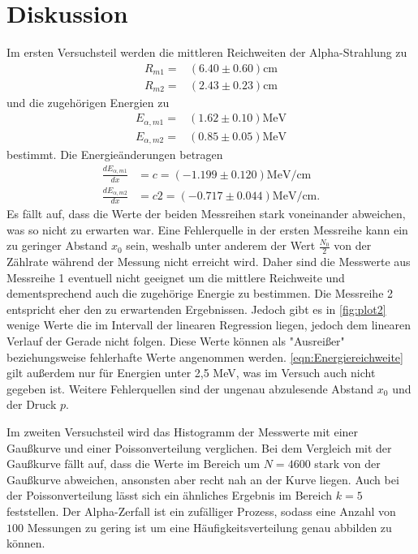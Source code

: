 \section{Diskussion}
\label{sec:Diskussion}

Im ersten Versuchsteil werden die mittleren Reichweiten der Alpha-Strahlung zu
\begin{align*}
    R_{m1}=& (6.40 \pm 0.60)\si{\centi\meter}\\
    R_{m2}=& (2.43 \pm 0.23)\si{\centi\meter}
\end{align*}
und die zugehörigen Energien zu
\begin{align*}
    E_{\alpha, m1}=& (1.62 \pm 0.10)\si{\mega\eV}\\
    E_{\alpha, m2}=& (0.85 \pm 0.05)\si{\mega\eV}
\end{align*}
bestimmt.
Die Energieänderungen betragen
\begin{align*}
    \frac{dE_{\alpha, m1}}{dx} &= c = (-1.199 \pm  0.120)\si{\mega\eV\per\centi\meter}\\
    \frac{dE_{\alpha, m2}}{dx} &= c2 = (-0.717 \pm  0.044)\si{\mega\eV\per\centi\meter}.
\end{align*}
Es fällt auf, dass die Werte der beiden Messreihen stark voneinander abweichen, was so nicht zu erwarten war.
Eine Fehlerquelle in der ersten Messreihe kann ein zu geringer Abstand $x_0$ sein, weshalb unter anderem der Wert $\frac{N_0}{2}$ 
von der Zählrate während der Messung nicht erreicht wird.
Daher sind die Messwerte aus Messreihe 1 eventuell nicht geeignet um die mittlere Reichweite und dementsprechend auch die zugehörige Energie
zu bestimmen.
Die Messreihe 2 entspricht eher den zu erwartenden Ergebnissen. Jedoch gibt es in \autoref{fig:plot2} wenige Werte die im Intervall der 
linearen Regression liegen, jedoch dem linearen Verlauf der Gerade nicht folgen. Diese Werte können als "Ausreißer" beziehungsweise 
fehlerhafte Werte angenommen werden.
\autoref{eqn:Energiereichweite} gilt außerdem nur für Energien unter 2,5 MeV, was im Versuch auch nicht gegeben ist.
Weitere Fehlerquellen sind der ungenau abzulesende Abstand $x_0$ und der Druck $p$.

Im zweiten Versuchsteil wird das Histogramm der Messwerte mit einer Gaußkurve und einer Poissonverteilung verglichen.
Bei dem Vergleich mit der Gaußkurve fällt auf, dass die Werte im Bereich um $N=4600$ stark von der Gaußkurve abweichen, ansonsten
aber recht nah an der Kurve liegen. 
Auch bei der Poissonverteilung lässt sich ein ähnliches Ergebnis im Bereich $k=5$ feststellen.
Der Alpha-Zerfall ist ein zufälliger Prozess, sodass eine Anzahl von $100$ Messungen zu gering ist um eine Häufigkeitsverteilung
genau abbilden zu können.